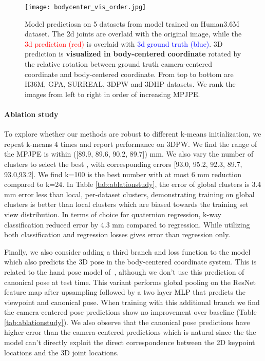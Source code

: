 \documentclass[runningheads]{llncs}
\begin{document}
\begin{figure}[t]\centering
\texttt{[image: bodycenter\_vis\_order.jpg]}
\caption{Model predictiosn on 5 datasets from model trained on Human3.6M dataset.
   The 2d joints are overlaid with the original image, while the
   \textcolor{red}{3d prediction (red)} is overlaid with \textcolor{blue}{3d
   ground truth (blue)}. 3D prediction is \textbf{visualized in body-centered
   coordinate} rotated by the relative rotation between ground truth
   camera-centered coordinate and body-centered coordinate. From top to bottom
   are \textsc{H36M, GPA, SURREAL, 3DPW} and \textsc{3DHP} datasets. We rank
   the images from left to right in order of increasing MPJPE.} 
\label{fig:qualitativeresults}
\vspace{-0.15in}
\end{figure}

\paragraph{Ablation study} To explore whether our methods are robust to
different k-means initialization, we repeat k-means 4 times and report
performance on 3DPW. We find the range of the MPJPE is within  
([89.9, 89.6, 90.2, 89.7]) mm. We also vary the number of clusters to select
the best , with corresponding errors [93.0,
95.2, 92.3, 89.7, 93.0,93.2]. We find k=100 is the best number with at most 6
mm reduction compared to k=24.  In Table \ref{tab:ablationstudy}, the error
of global clusters is 3.4 mm error less than local, per-dataset clusters,
demonstrating training on global clusters is better than local clusters
which are biased towards the training set view distribution.  In terms of
choice for quaternion regression, k-way classification reduced error by 4.3 mm
compared to regression. While utilizing both classification and regression
losses gives error than regression only.



Finally, we also consider adding a third branch and loss function to the model
which also predicts the 3D pose in the body-centered coordinate system. This is
related to the hand pose model of~\cite{zb2017hand}, although we don't use this
prediction of canonical pose at test time. This variant performs global pooling
on the ResNet feature map after upsampling followed by a two layer MLP that
predicts the viewpoint  and canonical pose. When training with this additional
branch we find the camera-centered pose predictions show no improvement over
baseline (Table \ref{tab:ablationstudy}). We also observe that the canonical
pose predictions have higher error than the camera-centered predictions which
is natural since the the model can't directly exploit the direct correspondence
between the 2D keypoint locations and the 3D joint locations. 
\end{document}
